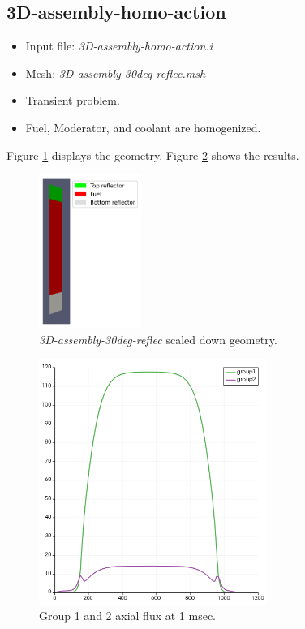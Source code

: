 \documentclass[11pt,letterpaper]{article}
\begin{document}
\subsection{3D-assembly-homo-action}

	\begin{itemize}
		\item Input file: \textit{3D-assembly-homo-action.i}
		\item Mesh: \textit{3D-assembly-30deg-reflec.msh}
		\item Transient problem.
		\item Fuel, Moderator, and coolant are homogenized.
	\end{itemize}

Figure \ref{fig:3D-assembly-homo} displays the geometry.
Figure \ref{fig:3D-assembly-homo1} shows the results.

	\begin{figure}[htbp!]
		\centering
		\includegraphics[height=5cm]{3D-assembly-homo-mesh}
		\caption{\textit{3D-assembly-30deg-reflec} scaled down geometry.}
		\label{fig:3D-assembly-homo}
	\end{figure}

	\begin{figure}[htbp!]
		\centering
		\includegraphics[height=8cm]{3D-assembly-homo}
		\caption{Group 1 and 2 axial flux at 1 msec.}
		\label{fig:3D-assembly-homo1}
	\end{figure}
\end{document}
